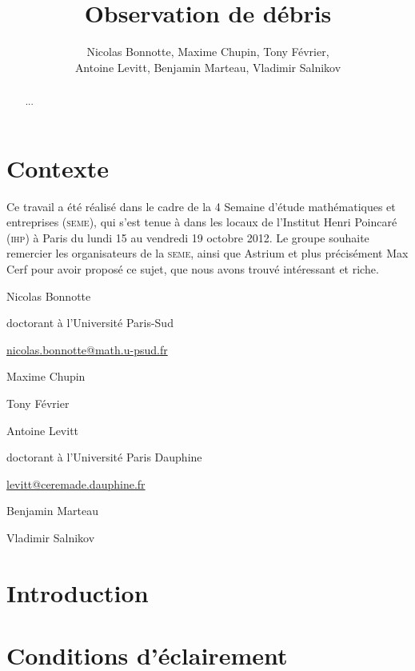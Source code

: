 \documentclass[11pt,a4paper,reqno]{amsart}
\title{Observation de débris}
\author{Nicolas Bonnotte, Maxime Chupin, Tony Février,\\ Antoine Levitt,
  Benjamin Marteau, Vladimir Salnikov}
\newcommand{\participant}[3]{%
	\begin{center}
		#1 \footnotesize
		
		#2
		
		\url{#3}
	\end{center}
	\vspace{0.5em}
}
\begin{document}
\maketitle


\begin{abstract}
  ...
\end{abstract}


\section{Contexte}

Ce travail a été réalisé dans le cadre de la 4\ieme{} 
Semaine d'étude mathématiques et entreprises (\textsc{seme}), qui s'est tenue à
dans les locaux de l'Institut Henri Poincaré (\textsc{ihp}) à Paris du lundi 15
au vendredi 19 octobre 2012. Le groupe souhaite remercier les
organisateurs de la \textsc{seme}, ainsi que Astrium et plus précisément Max
Cerf pour avoir proposé ce sujet, que nous avons trouvé intéressant et
riche.

\begin{multicols}{2}
\participant{Nicolas Bonnotte}{doctorant à l'Université Paris-Sud}{nicolas.bonnotte@math.u-psud.fr}
\participant{Maxime Chupin}{}{}
\participant{Tony Février}{}{}
\participant{Antoine Levitt}{doctorant à l'Université Paris Dauphine}{levitt@ceremade.dauphine.fr}
\participant{Benjamin Marteau}{}{}
\participant{Vladimir Salnikov}{}{}
\end{multicols}



\section{Introduction}








\section{Conditions d'éclairement}
\end{document}
